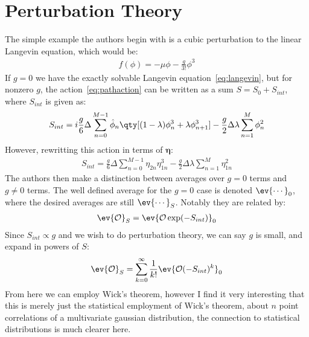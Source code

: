 \documentclass[12pt]{article}
\begin{document}
\section{Perturbation Theory}
The simple example the authors begin with is a cubic perturbation to the linear Langevin equation, which would be:
\begin{align*}
  f(\phi)=-\mu\phi-\frac{g}{3!}\phi^3
\end{align*}
If $g=0$ we have the exactly solvable Langevin equation~\ref{eq:langevin}, but for nonzero $g$, the action~\ref{eq:pathaction} can be written as a sum $S=S_0+S_{int}$, where $S_{int}$ is given as:
\begin{align*}
  S_{int}=i\frac{g}6\Delta\sum_{n=0}^{M-1}\hat{\phi}_n
  \qty[(1-\lambda)\phi_n^3+\lambda\phi_{n+1}^3]
  -\frac{g}2\Delta\lambda\sum_{n=1}^M\phi_n^2
\end{align*}
However, rewritting this action in terms of $\bm{\eta}$:
\begin{align*}
  S_{int}=\frac{g}6\Delta\sum_{n=0}^{M-1}\eta_{2n}\eta_{1n}^3
  -\frac{g}2\Delta\lambda\sum_{n=1}^M\eta^2_{1n}
\end{align*}
The authors then make a distinction between averages over $g=0$ terms and $g\neq0$ terms. The well defined average for the $g=0$ case is denoted $\ev{\cdots}_0$, where the desired averages are still $\ev{\cdots}_S$. Notably they are related by:
\begin{align*}
  \ev{\mathcal{O}}_S=\ev{\mathcal{O}\exp(-S_{int})}_0
\end{align*}
Since $S_{int}\propto g$ and we wish to do perturbation theory, we can say $g$ is small, and expand in powers of $S$:
\begin{align*}
  \ev{\mathcal{O}}_S=\sum_{k=0}^\infty\frac1{k!}\ev{\mathcal{O}(-S_{int})^k}_0
\end{align*}
From here we can employ Wick's theorem, however I find it very interesting that this is merely just the statistical employment of Wick's theorem, about $n$ point correlations of a multivariate gaussian distribution, the connection to statistical distributions is much clearer here.
\end{document}
